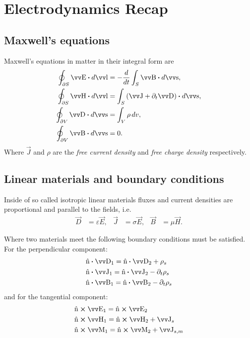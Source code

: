 \documentclass[margin=small]{tex/hsrzf}
\theoremstyle{elmagzf}
\begin{document}
\section{Electrodynamics Recap}

\subsection{Maxwell's equations}

Maxwell's equations in matter in their integral form are
\begin{subequations}
  \begin{align}
    \oint_{\partial S} \vec{E} \dotp d\vec{l} &= -\frac{d}{dt} \int_S \vec{B} \dotp d\vec{s}, \\
    \oint_{\partial S} \vec{H} \dotp d\vec{l} &= \int_S \left(
      \vec{J} + \partial_t \vec{D}
    \right) \dotp d\vec{s}, \\
    \oint_{\partial V} \vec{D} \dotp d\vec{s} &= \int_V \rho \,dv, \\
    \oint_{\partial V} \vec{B} \dotp d\vec{s} &= 0.
  \end{align}
\end{subequations}
Where \(\vec{J}\) and \(\rho\) are the \emph{free current density} and
\emph{free charge density} respectively.

\subsection{Linear materials and boundary conditions}

Inside of so called isotropic linear materials fluxes and current
densities are proportional and parallel to the fields, i.e.
\begin{align*}
  \vec{D} &= \varepsilon \vec{E}, & \vec{J} &= \sigma \vec{E}, & \vec{B} &= \mu \vec{H}.
\end{align*}

Where two materials meet the following boundary conditions must be satisfied.
For the perpendicular component:
\begin{subequations}
  \begin{align}
    &\uvec{n} \dotp \vec{D}_1   = \uvec{n} \dotp \vec{D}_2 + \rho_s \\
    &\uvec{n} \dotp \vec{J}_1   = \uvec{n} \dotp \vec{J}_2 - \partial_t \rho_s \\
    &\uvec{n} \dotp \vec{B}_1   = \uvec{n} \dotp \vec{B}_2 - \partial_t \rho_s
  \end{align}
\end{subequations}
and for the tangential component:
\begin{subequations}
  \begin{align}
    &\uvec{n} \crossp \vec{E}_1 = \uvec{n} \crossp \vec{E}_2 \\
    &\uvec{n} \crossp \vec{H}_1 = \uvec{n} \crossp \vec{H}_2 + \vec{J}_s \\
    &\uvec{n} \crossp \vec{M}_1 = \uvec{n} \crossp \vec{M}_2 + \vec{J}_{s,m}
  \end{align}
\end{subequations}
\end{document}
